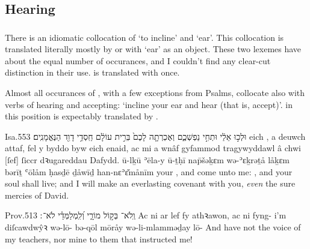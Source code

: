 \subsection{Hearing}

\subsubsection{}

\subsubsection{}


\begin{paper}
	There is an idiomatic collocation of  ‘to incline’ and  ‘ear’. This collocation is translated literally mostly by  or  with  ‘ear’ as an object. These two lexemes have about the equal number of occurances, and I couldn’t find any clear-cut distinction in their use.  is translated with  once.

	Almost all occurances of , with a few exceptions from Psalms, collocate also with verbs of hearing and accepting: ‘incline your ear and hear (that is, accept)’.  in this position is expectably translated by .
\end{paper}

\begin{example}{Isa.}{55}{3}{}{}
	\quoling
	{  וּלְכ֣וּ אֵלַ֔י  וּתְחִ֣י נַפְשְׁכֶ֑ם וְאֶכְרְתָ֤ה לָכֶם֙ בְּרִ֣ית עוֹלָ֔ם חַֽסְדֵ֥י דָוִ֖ד הַנֶּאֱמָנִֽים׃}
	{ eich , a deuwch attaf,  fel y byddo byw eich enaid, ac mi a wnâf gyfammod tragywyddawl â chwi [ſef] ſiccr dꝛugareddau Dafydd.}
	{  ū-lḵū ʾēla-y  ū-ṯḥī nap̄šəḵɛm wə-ʾɛḵrəṯå låḵɛm bərīṯ ʿōlåm ḥasḏē ḏåwīḏ han-nɛʾɛ̆månīm}
	{ your , and come unto me: , and your soul shall live; and I will make an everlasting covenant with you, \textit{even} the sure mercies of David.}
\end{example}

\begin{example}{Prov.}{5}{13}{}{}
	\quoling
	{וְֽלֹא־ בְּק֣וֹל מוֹרָ֑י וְ֝לִֽמְלַמְּדַ֗י לֹא־ ׃}
	{Ac ni  ar lef fy athꝛawon, ac ni  fyng- i’m diſcawdwŷꝛ}
	{wə-lō- bə-qōl mōråy wə-li-mlamməḏay lō- }
	{And have not  the voice of my teachers, nor  mine  to them that instructed me!}
\end{example}



